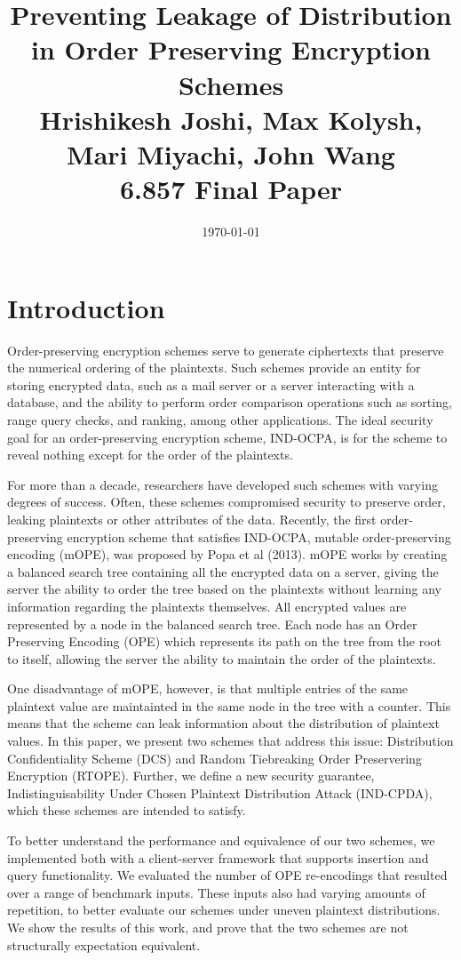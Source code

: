 \documentclass[12pt]{article}
\title{
  Preventing Leakage of Distribution in Order Preserving Encryption Schemes \\ \vspace*{.3in}
\small Hrishikesh Joshi, Max Kolysh, Mari Miyachi, John Wang \\
\small 6.857 Final Paper}
\date{\today}
\begin{document}
\maketitle

\section{Introduction}

Order-preserving encryption schemes serve to generate ciphertexts that preserve the numerical ordering of the plaintexts. Such schemes provide an entity for storing encrypted data, such as a mail server or a server interacting with a database, and the ability to perform order comparison operations such as sorting, range query checks, and ranking, among other applications. The ideal security goal for an order-preserving encryption scheme, IND-OCPA, is for the scheme to reveal nothing except for the order of the plaintexts.

For more than a decade, researchers have developed such schemes with varying degrees of success. Often, these schemes compromised security to preserve order, leaking plaintexts or other attributes of the data. Recently, the first order-preserving encryption scheme that satisfies IND-OCPA, mutable order-preserving encoding (mOPE), was proposed by Popa et al (2013). mOPE works by creating a balanced search tree containing all the encrypted data on a server, giving the server the ability to order the tree based on the plaintexts without learning any information regarding the plaintexts themselves. All encrypted values are represented by a node in the balanced search tree. Each node has an Order Preserving Encoding (OPE) which represents its path on the tree from the root to itself, allowing the server the ability to maintain the order of the plaintexts.

One disadvantage of mOPE, however, is that multiple entries of the same plaintext value are maintainted in the same node in the tree with a counter. This means that the scheme can leak information about the distribution of plaintext values. In this paper, we present two schemes that address this issue: Distribution Confidentiality Scheme (DCS) and Random Tiebreaking Order Preservering Encryption (RTOPE). Further, we define a new security guarantee, Indistinguisability Under Chosen Plaintext Distribution Attack (IND-CPDA), which these schemes are intended to satisfy.

To better understand the performance and equivalence of our two schemes, we implemented both with a client-server framework that supports insertion and query functionality. We evaluated the number of OPE re-encodings that resulted over a range of benchmark inputs. These inputs also had varying amounts of repetition, to better evaluate our schemes under uneven plaintext distributions. We show the results of this work, and prove that the two schemes are not structurally expectation equivalent.
\end{document}

